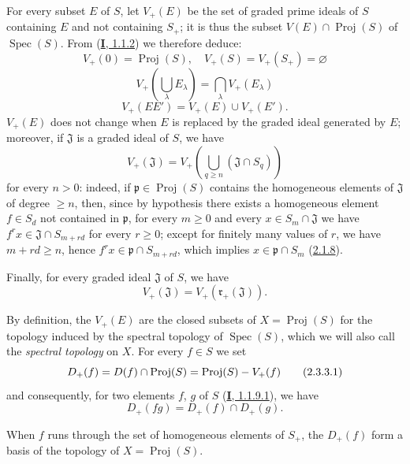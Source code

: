 \begin{env}[2.3.2]
\label{II.2.3.2}
For every subset $E$ of $S$, let $V_+(E)$ be the set of graded prime
ideals of $S$ containing $E$ and not containing $S_+$; it is thus the
subset $V(E)\cap\operatorname{Proj}(S)$ of
$\operatorname{Spec}(S)$. From (\hyperref[I.1.1.2]{\textbf{I}, 1.1.2}) we
therefore deduce:
\[
  \label{II.2.3.2.1}
  V_+(0)=\operatorname{Proj}(S),\quad
  V_+(S)=V_+(S_+)=\varnothing
  \tag{2.3.2.1}
\]
\[
  \label{II.2.3.2.2}
  V_+\left(\bigcup_\lambda E_\lambda\right)
  =\bigcap_\lambda V_+(E_\lambda)
  \tag{2.3.2.2}
\]
\[
  \label{II.2.3.2.3}
  V_+(EE')=V_+(E)\cup V_+(E').
  \tag{2.3.2.3}
\]
$V_+(E)$ does not change when $E$ is replaced by the graded ideal generated
by $E$; moreover, if $\mathfrak{J}$ is a graded ideal of $S$, we have
\[
  \label{II.2.3.2.4}
  V_+(\mathfrak{J})
  =V_+\left(\bigcup_{q\geq n}(\mathfrak{J}\cap S_q)\right)
  \tag{2.3.2.4}
\]
for every $n>0$: indeed, if
$\mathfrak{p}\in\operatorname{Proj}(S)$ contains the homogeneous elements of
$\mathfrak{J}$ of degree $\geq n$, then, since by hypothesis there exists a
homogeneous element $f\in S_d$ not contained in $\mathfrak{p}$, for every
$m\geq 0$ and every $x\in S_m\cap\mathfrak{J}$ we have
$f^r x\in\mathfrak{J}\cap S_{m+rd}$ for every $r\geq0$; except for
finitely many values of $r$, we have $m+rd\geq n$, hence
$f^r x\in\mathfrak{p}\cap S_{m+rd}$, which implies
$x\in\mathfrak{p}\cap S_m$
(\hyperref[II.2.1.8]{2.1.8}).

Finally, for every graded ideal $\mathfrak{J}$ of $S$, we have
\[
  \label{II.2.3.2.5}
  V_+(\mathfrak{J})=V_+(\mathfrak{r}_+(\mathfrak{J})).
  \tag{2.3.2.5}
\]
\end{env}

\begin{env}[2.3.3]
\label{II.2.3.3}
By definition, the $V_+(E)$ are the closed subsets of
$X=\operatorname{Proj}(S)$ for the topology induced by the spectral
topology of $\operatorname{Spec}(S)$, which we will also call the
\emph{spectral topology} on $X$. For every $f\in S$ we set
\[
  \label{II.2.3.3.1}
  D_+(f)=D(f)\cap\operatorname{Proj}(S)
  =\operatorname{Proj}(S)- V_+(f)
  \tag{2.3.3.1}
\]
and consequently, for two elements $f$, $g$ of $S$
(\hyperref[I.1.1.9.1]{\textbf{I}, 1.1.9.1}), we have
\[
  \label{II.2.3.3.2}
  D_+(fg)=D_+(f)\cap D_+(g).
  \tag{2.3.3.2}
\]
\end{env}

\begin{proposition}[2.3.4]
\label{II.2.3.4}
When $f$ runs through the set of homogeneous elements of $S_+$, the
$D_+(f)$ form a basis of the topology of
$X=\operatorname{Proj}(S)$.
\end{proposition}

